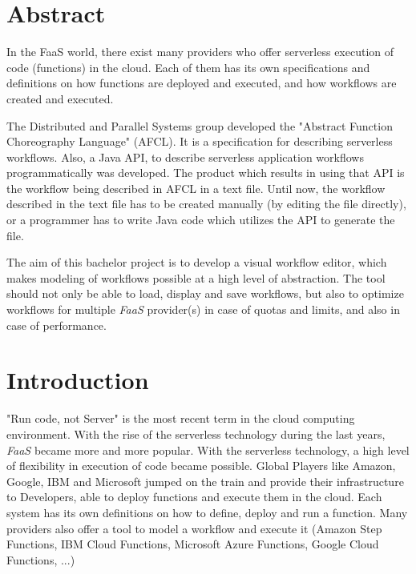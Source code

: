 \documentclass[a4paper,11pt,pdftex,halfparskip,cleardoubleempty]{scrbook}
\begin{document}


\cleardoublepage



\cleardoublepage

\pagestyle{plain}

\section*{Abstract}
In the FaaS world, there exist many providers who offer serverless execution of code (functions) in the cloud. Each of them has its own specifications and definitions on how functions are deployed and executed, and how workflows are created and executed.
\par
The Distributed and Parallel Systems group developed the "Abstract Function Choreography Language" (AFCL). It is a specification for describing serverless workflows. Also, a Java API, to describe serverless application workflows programmatically was developed.
The product which results in using that API is the workflow being described in AFCL in a text file.
Until now, the workflow described in the text file has to be created manually (by editing the file directly), or a programmer has to write Java code which utilizes the API to generate the file.
\par
The aim of this bachelor project is to develop a visual workflow editor, which makes modeling of workflows possible at a high level of abstraction. The tool should not only be able to load, display and save workflows, but also to optimize workflows for multiple \emph{FaaS} provider(s) in case of quotas and limits, and also in case of performance.

\cleardoublepage

\tableofcontents

\newpage

\section{Introduction}
"Run code, not Server" is the most recent term in the cloud computing environment.
With the rise of the serverless technology during the last years, \emph{FaaS} became more and more popular.
With the serverless technology, a high level of flexibility in execution of code became possible. Global Players like Amazon, Google, IBM and Microsoft jumped on the train and provide their infrastructure to Developers, able to deploy functions and execute them in the cloud. Each system has its own definitions on how to define, deploy and run a function. Many providers also offer a tool to model a workflow and execute it (Amazon Step Functions, IBM Cloud Functions, Microsoft Azure Functions, Google Cloud Functions, ...)
\end{document}
